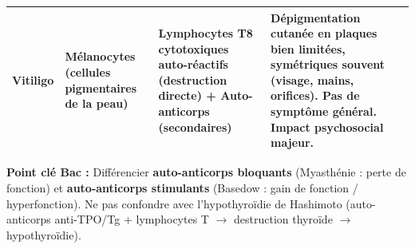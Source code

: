 \documentclass[11pt]{article}
\begin{document}
\begin{propriete}
\begin{center}
\begin{tabularx}{\linewidth}{|l|X|X|X|}
\textbf{Vitiligo} & Mélanocytes (cellules pigmentaires de la peau) & \textbf{Lymphocytes T8 cytotoxiques} auto-réactifs (destruction directe) + Auto-anticorps (secondaires) & \textbf{Dépigmentation} cutanée en plaques bien limitées, symétriques souvent (visage, mains, orifices). Pas de symptôme général. Impact psychosocial majeur. \\ \hline
\end{tabularx}
\end{center}
\textbf{Point clé Bac :} Différencier \textbf{auto-anticorps bloquants} (Myasthénie : perte de fonction) et \textbf{auto-anticorps stimulants} (Basedow : gain de fonction / hyperfonction). Ne pas confondre avec l'hypothyroïdie de Hashimoto (auto-anticorps anti-TPO/Tg + lymphocytes T $\rightarrow$ destruction thyroïde $\rightarrow$ hypothyroïdie).
\end{propriete}
\end{document}
